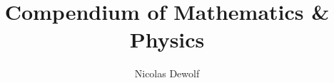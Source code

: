 \documentclass[11pt, a4paper]{report}
\begin{document}
\title{Compendium of Mathematics \& Physics}
\author{Nicolas Dewolf}
\maketitle

\tableofcontents

%
%
%
%
%
\end{document}
